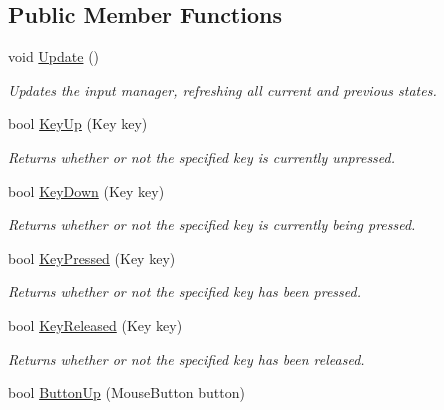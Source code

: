 \subsection*{Public Member Functions}
\begin{DoxyCompactItemize}
\item 
void \hyperlink{interface_tri_devs_1_1_tri_engine2_d_1_1_input_1_1_i_input_manager_a0cc046decb859d0f4d0b23a5a83d078f}{Update} ()
\begin{DoxyCompactList}\small\item\em Updates the input manager, refreshing all current and previous states. \end{DoxyCompactList}\item 
bool \hyperlink{interface_tri_devs_1_1_tri_engine2_d_1_1_input_1_1_i_input_manager_ade2a17c4700b1588c35f9e150fb9d529}{Key\-Up} (Key key)
\begin{DoxyCompactList}\small\item\em Returns whether or not the specified key is currently unpressed. \end{DoxyCompactList}\item 
bool \hyperlink{interface_tri_devs_1_1_tri_engine2_d_1_1_input_1_1_i_input_manager_a380e86578e668193eb874acbd2754389}{Key\-Down} (Key key)
\begin{DoxyCompactList}\small\item\em Returns whether or not the specified key is currently being pressed. \end{DoxyCompactList}\item 
bool \hyperlink{interface_tri_devs_1_1_tri_engine2_d_1_1_input_1_1_i_input_manager_a0dcc608b0c3ffb806262c9f829373dcb}{Key\-Pressed} (Key key)
\begin{DoxyCompactList}\small\item\em Returns whether or not the specified key has been pressed. \end{DoxyCompactList}\item 
bool \hyperlink{interface_tri_devs_1_1_tri_engine2_d_1_1_input_1_1_i_input_manager_a54feb5f23a217ad5bcd104cc8912247b}{Key\-Released} (Key key)
\begin{DoxyCompactList}\small\item\em Returns whether or not the specified key has been released. \end{DoxyCompactList}\item 
bool \hyperlink{interface_tri_devs_1_1_tri_engine2_d_1_1_input_1_1_i_input_manager_a7e3896e1a022954b73b5e6323e3c85ae}{Button\-Up} (Mouse\-Button button)

\end{DoxyCompactItemize}
